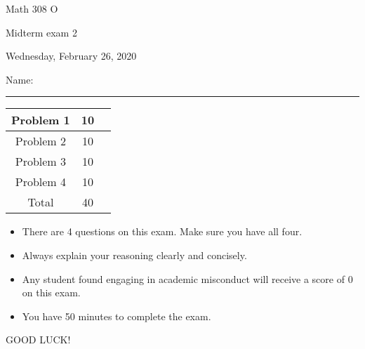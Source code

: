 \documentclass[12 pt]{report}
\begin{document}
\noindent \vfill \noindent \large

\centerline{Math 308 O}

\centerline{Midterm exam 2}

\centerline{Wednesday, February 26, 2020}

\normalsize

\vfill
\medskip
Name: \rule{10cm}{1pt}

\bigskip

\vfill
\begin{center}
{\large
\begin{tabular}{||c|c|r||}
\hline Problem 1 & 10 & \hspace{10mm} \hfill \\
\hline Problem 2 & 10 & \hspace{10mm} \hfill \\
\hline Problem 3 & 10 & \hspace{10mm} \hfill \\
\hline Problem 4 & 10 & \hspace{10mm} \hfill \\
\hline Total & 40 & \hspace{10mm} \hfill \\
\hline
\end{tabular}
}
\end{center}
\vfill
\begin{itemize}
\item There are 4 questions on this exam. Make sure you have all four.
\item Always explain your reasoning clearly and concisely. 
\item Any student found engaging in academic misconduct will receive
a score of 0 on this exam.
\item You have 50 minutes to complete the exam. \\
\end{itemize}
\vfill
\begin{center}GOOD LUCK!\end{center}

\newpage
\end{document}
